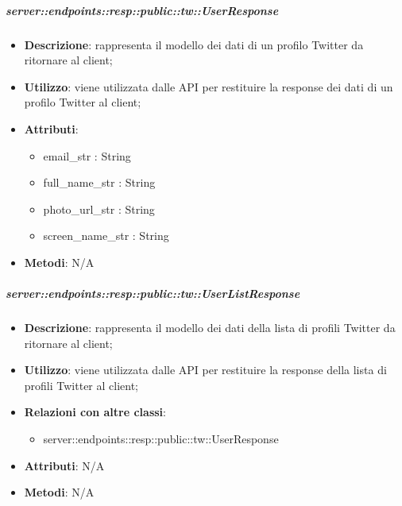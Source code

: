     \subparagraph{server::endpoints::resp::public::tw::UserResponse} %
    \label{subp:bdsm_app_server_endpoints_resp_public_tw_userresponse}
    \begin{itemize}
      \item \textbf{Descrizione}: rappresenta il modello dei dati di un profilo Twitter da ritornare al client;
      \item \textbf{Utilizzo}: viene utilizzata dalle API per restituire la response dei dati di un profilo Twitter al client;
      
	  \item \textbf{Attributi}:  
	  	\begin{itemize}
	  		\item email\_str : String
	  		\item full\_name\_str : String
	  		\item photo\_url\_str : String
	  		\item screen\_name\_str : String
	  	\end{itemize}
	  \item \textbf{Metodi}: N/A
      \end{itemize}

    \subparagraph{server::endpoints::resp::public::tw::UserListResponse} %
    \label{subp:bdsm_app_server_endpoints_resp_public_tw_userlistresponse}
    \begin{itemize}
      \item \textbf{Descrizione}: rappresenta il modello dei dati della lista di profili Twitter da ritornare al client;
      \item \textbf{Utilizzo}: viene utilizzata dalle API per restituire la response della lista di profili Twitter al client;
      \item \textbf{Relazioni con altre classi}:
        \begin{itemize}
          \item server::endpoints::resp::public::tw::UserResponse
        \end{itemize}
	  \item \textbf{Attributi}: N/A
	  \item \textbf{Metodi}: N/A
      \end{itemize}

